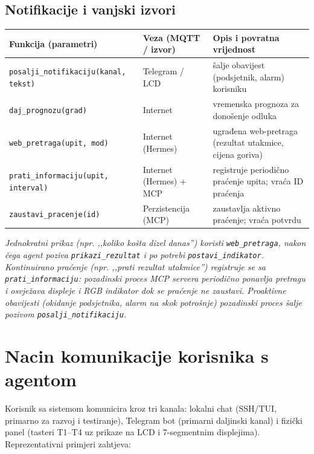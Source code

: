 \documentclass[11pt,a4paper]{article}
\begin{document}
\subsection{Notifikacije i vanjski izvori}
\begin{tabularx}{\textwidth}{@{}L{0.32\textwidth} L{0.26\textwidth} X@{}}
      \toprule
      \textbf{Funkcija (parametri)}                & \textbf{Veza (MQTT / izvor)} & \textbf{Opis i povratna vrijednost}                      \\
      \midrule
      \texttt{posalji\_notifikaciju(kanal, tekst)} & Telegram / LCD               & šalje obavijest (podsjetnik, alarm) korisniku            \\
      \texttt{daj\_prognozu(grad)}                 & Internet                     & vremenska prognoza za donošenje odluka                   \\
      \texttt{web\_pretraga(upit, mod)}            & Internet (Hermes)            & ugrađena web-pretraga (rezultat utakmice, cijena goriva) \\
      \texttt{prati\_informaciju(upit, interval)}  & Internet (Hermes) + MCP      & registruje periodično praćenje upita; vraća ID praćenja  \\
      \texttt{zaustavi\_pracenje(id)}              & Perzistencija (MCP)          & zaustavlja aktivno praćenje; vraća potvrdu               \\
      \bottomrule
\end{tabularx}

\textit{Jednokratni prikaz (npr. ,,koliko košta dizel danas'') koristi
      \texttt{web\_pretraga}, nakon čega agent poziva \texttt{prikazi\_rezultat} i po
      potrebi \texttt{postavi\_indikator}. Kontinuirano praćenje (npr. ,,prati rezultat
      utakmice'') registruje se sa \texttt{prati\_informaciju}: pozadinski proces MCP
      servera periodično ponavlja pretragu i osvježava displeje i RGB indikator dok se
      praćenje ne zaustavi. Proaktivne obavijesti (okidanje podsjetnika, alarm na skok
      potrošnje) pozadinski proces šalje pozivom \texttt{posalji\_notifikaciju}.}

\section{Nacin komunikacije korisnika s agentom}

Korisnik sa sistemom komunicira kroz tri kanala: lokalni chat (SSH/TUI, primarno za
razvoj i testiranje), Telegram bot (primarni daljinski kanal) i fizički panel (tasteri
T1--T4 uz prikaze na LCD i 7-segmentnim displejima). Reprezentativni primjeri zahtjeva:
\end{document}
